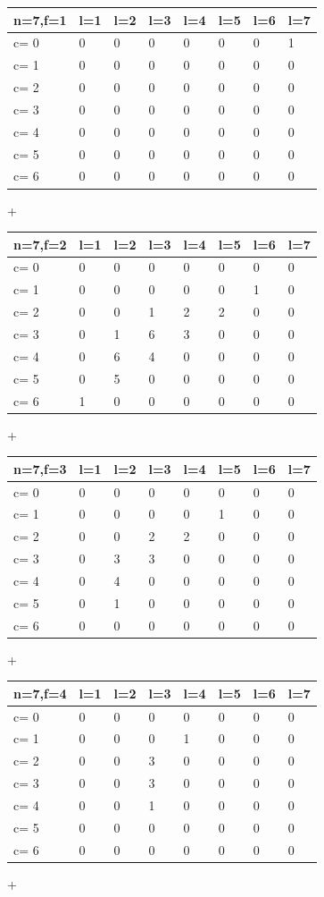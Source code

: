 \tiny{
\begin{tabular}{l | l l l l l l l}
\hline
n=7,f=1&l=1&l=2&l=3&l=4&l=5&l=6&l=7\\
\hline
c= 0& 0& 0& 0& 0& 0& 0& 1\\
c= 1& 0& 0& 0& 0& 0& 0& 0\\
c= 2& 0& 0& 0& 0& 0& 0& 0\\
c= 3& 0& 0& 0& 0& 0& 0& 0\\
c= 4& 0& 0& 0& 0& 0& 0& 0\\
c= 5& 0& 0& 0& 0& 0& 0& 0\\
c= 6& 0& 0& 0& 0& 0& 0& 0\\
\hline
\end{tabular}
+
\begin{tabular}{l | l l l l l l l}
\hline
n=7,f=2&l=1&l=2&l=3&l=4&l=5&l=6&l=7\\
\hline
c= 0& 0& 0& 0& 0& 0& 0& 0\\
c= 1& 0& 0& 0& 0& 0& 1& 0\\
c= 2& 0& 0& 1& 2& 2& 0& 0\\
c= 3& 0& 1& 6& 3& 0& 0& 0\\
c= 4& 0& 6& 4& 0& 0& 0& 0\\
c= 5& 0& 5& 0& 0& 0& 0& 0\\
c= 6& 1& 0& 0& 0& 0& 0& 0\\
\hline
\end{tabular}
+

\begin{tabular}{l | l l l l l l l}
\hline
n=7,f=3&l=1&l=2&l=3&l=4&l=5&l=6&l=7\\
\hline
c= 0& 0& 0& 0& 0& 0& 0& 0\\
c= 1& 0& 0& 0& 0& 1& 0& 0\\
c= 2& 0& 0& 2& 2& 0& 0& 0\\
c= 3& 0& 3& 3& 0& 0& 0& 0\\
c= 4& 0& 4& 0& 0& 0& 0& 0\\
c= 5& 0& 1& 0& 0& 0& 0& 0\\
c= 6& 0& 0& 0& 0& 0& 0& 0\\
\hline
\end{tabular}
+
\begin{tabular}{l | l l l l l l l}
\hline
n=7,f=4&l=1&l=2&l=3&l=4&l=5&l=6&l=7\\
\hline
c= 0& 0& 0& 0& 0& 0& 0& 0\\
c= 1& 0& 0& 0& 1& 0& 0& 0\\
c= 2& 0& 0& 3& 0& 0& 0& 0\\
c= 3& 0& 0& 3& 0& 0& 0& 0\\
c= 4& 0& 0& 1& 0& 0& 0& 0\\
c= 5& 0& 0& 0& 0& 0& 0& 0\\
c= 6& 0& 0& 0& 0& 0& 0& 0\\
\hline
\end{tabular}
+

}
